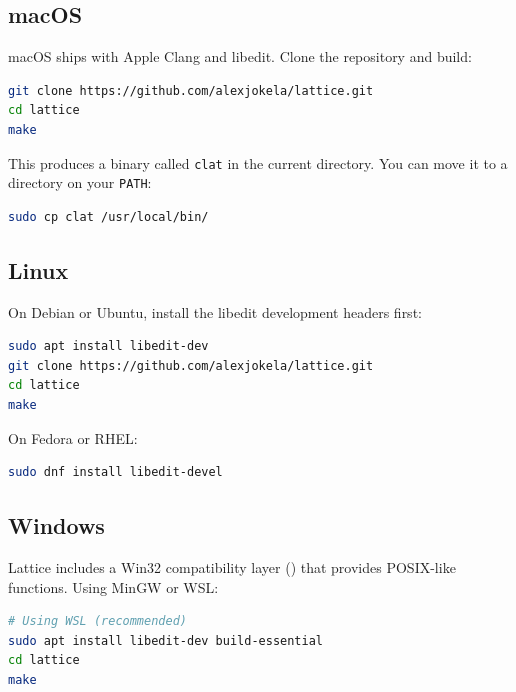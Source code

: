\subsection{macOS}\label{subsec:install-macos}

macOS ships with Apple Clang and libedit.
Clone the repository and build:

\begin{lstlisting}[language=bash, numbers=none]
git clone https://github.com/alexjokela/lattice.git
cd lattice
make
\end{lstlisting}

This produces a binary called \texttt{clat} in the current directory.
You can move it to a directory on your \texttt{PATH}:

\begin{lstlisting}[language=bash, numbers=none]
sudo cp clat /usr/local/bin/
\end{lstlisting}

\subsection{Linux}\label{subsec:install-linux}

On Debian or Ubuntu, install the libedit development headers first:

\begin{lstlisting}[language=bash, numbers=none]
sudo apt install libedit-dev
git clone https://github.com/alexjokela/lattice.git
cd lattice
make
\end{lstlisting}

On Fedora or RHEL:

\begin{lstlisting}[language=bash, numbers=none]
sudo dnf install libedit-devel
\end{lstlisting}

\subsection{Windows}\label{subsec:install-windows}

Lattice includes a Win32 compatibility layer () that provides POSIX-like functions.
Using MinGW or WSL:

\begin{lstlisting}[language=bash, numbers=none]
# Using WSL (recommended)
sudo apt install libedit-dev build-essential
cd lattice
make
\end{lstlisting}

